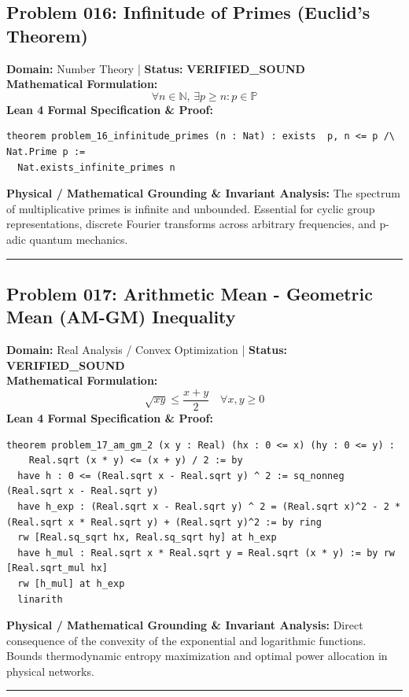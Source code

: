 \documentclass[10pt,a4paper]{article}
\begin{document}
\subsection*{Problem 016: Infinitude of Primes (Euclid's Theorem)}
\textbf{Domain:} Number Theory \quad | \quad \textbf{Status:} \textcolor{green!70!black}{\textbf{VERIFIED\_SOUND}}\\
\textbf{Mathematical Formulation:}
\begin{equation*}
  \forall n \in \mathbb{N}, \, \exists p \ge n: p \in \mathbb{P}
\end{equation*}
\textbf{Lean 4 Formal Specification \& Proof:}
\begin{lstlisting}
theorem problem_16_infinitude_primes (n : Nat) : exists  p, n <= p /\ Nat.Prime p :=
  Nat.exists_infinite_primes n
\end{lstlisting}
\textbf{Physical / Mathematical Grounding \& Invariant Analysis:}
The spectrum of multiplicative primes is infinite and unbounded. Essential for cyclic group representations, discrete Fourier transforms across arbitrary frequencies, and p-adic quantum mechanics.
\vspace{0.8em}\hrule\vspace{0.8em}
\subsection*{Problem 017: Arithmetic Mean - Geometric Mean (AM-GM) Inequality}
\textbf{Domain:} Real Analysis / Convex Optimization \quad | \quad \textbf{Status:} \textcolor{green!70!black}{\textbf{VERIFIED\_SOUND}}\\
\textbf{Mathematical Formulation:}
\begin{equation*}
  \sqrt{x y} \le \frac{x + y}{2} \quad \forall x, y \ge 0
\end{equation*}
\textbf{Lean 4 Formal Specification \& Proof:}
\begin{lstlisting}
theorem problem_17_am_gm_2 (x y : Real) (hx : 0 <= x) (hy : 0 <= y) : 
    Real.sqrt (x * y) <= (x + y) / 2 := by
  have h : 0 <= (Real.sqrt x - Real.sqrt y) ^ 2 := sq_nonneg (Real.sqrt x - Real.sqrt y)
  have h_exp : (Real.sqrt x - Real.sqrt y) ^ 2 = (Real.sqrt x)^2 - 2 * (Real.sqrt x * Real.sqrt y) + (Real.sqrt y)^2 := by ring
  rw [Real.sq_sqrt hx, Real.sq_sqrt hy] at h_exp
  have h_mul : Real.sqrt x * Real.sqrt y = Real.sqrt (x * y) := by rw [Real.sqrt_mul hx]
  rw [h_mul] at h_exp
  linarith
\end{lstlisting}
\textbf{Physical / Mathematical Grounding \& Invariant Analysis:}
Direct consequence of the convexity of the exponential and logarithmic functions. Bounds thermodynamic entropy maximization and optimal power allocation in physical networks.
\vspace{0.8em}\hrule\vspace{0.8em}
\end{document}
